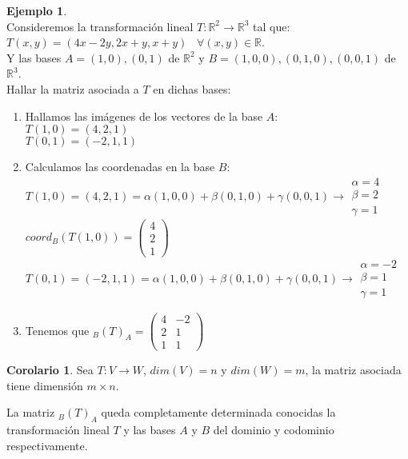 \documentclass[10pt]{article}
\theoremstyle{definition}
\newtheorem{corollary}{Corolario}[theorem]
\newtheorem{example}{Ejemplo}[section]
\begin{document}
\begin{example}{ \ }
	\\Consideremos la transformación lineal $T:\mathbb{R}^{2} \rightarrow \mathbb{R}^{3}$ tal que: $T(x,y)=(4x-2y,2x+y,x+y)$  $\forall (x,y)\in \mathbb{R}$.\\
	Y las bases $A={(1,0),(0,1)}$ de $\mathbb{R}^2$ y $B={(1,0,0),(0,1,0),(0,0,1)}$ de $\mathbb{R}^3$.\\
	Hallar la matriz asociada a $T$ en dichas bases:
	\begin{enumerate}
		\item Hallamos las imágenes de los vectores de la base $A$:\\
		      $T(1,0)=(4,2,1)$\\
		      $T(0,1)=(-2,1,1)$
		\item Calculamos las coordenadas en la base $B$:\\
		      $T(1,0)=(4,2,1)=\alpha (1,0,0)+\beta (0,1,0)+\gamma (0,0,1)\rightarrow \begin{matrix}\alpha =4\\\beta =2\\\gamma =1\end{matrix}$\\
		      $coord_B(T(1,0))=\begin{pmatrix}4\\2\\1\end{pmatrix}$\\
		      $T(0,1)=(-2,1,1)=\alpha(1,0,0)+\beta(0,1,0)+\gamma(0,0,1)\rightarrow \begin{matrix}\alpha =-2\\\beta =1\\\gamma =1\end{matrix}$\\
		\item Tenemos que $_B(T)_A=\begin{pmatrix}4 & -2\\2 & 1\\1 & 1\end{pmatrix}$
	\end{enumerate}
\end{example}
\begin{corollary}
	Sea $T:V\to W$, $dim(V)=n$ y $dim(W)=m$, la matriz asociada tiene dimensión $m\times n$.
\end{corollary}
La matriz $_B(T)_A$ queda completamente determinada conocidas la transformación lineal $T$ y las bases $A$ y $B$ del dominio y codominio respectivamente.\\
\end{document}
